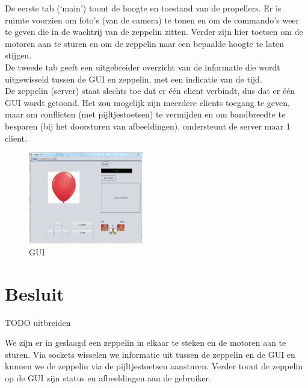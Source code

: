 \documentclass[eind]{penoverslag}
\begin{document}
De eerste tab (`main') toont de hoogte en toestand van de propellers. Er is ruimte voorzien om foto's (van de camera) te tonen en om de commando's weer te geven die in de wachtrij van de zeppelin zitten. Verder zijn hier toetsen om de motoren aan te sturen en om de zeppelin naar een bepaalde hoogte te laten stijgen.\\

De tweede tab geeft een uitgebreider overzicht van de informatie die wordt uitgewisseld tussen de GUI en zeppelin, met een indicatie van de tijd. \\

De zeppelin (server) staat slechts toe dat er \'e\'en client verbindt, dus dat er \'e\'en GUI wordt getoond. Het zou mogelijk zijn meerdere clients toegang te geven, maar om conflicten (met pijltjestoetsen) te vermijden en om bandbreedte te besparen (bij het doorsturen van afbeeldingen), ondersteunt de server maar 1 client. \\

\begin{figure}[ht!]
\centering
\includegraphics[height=40mm]{GUI.png}
\caption{GUI}
\label{GUI}
\end{figure}


\section{Besluit}
TODO uitbreiden

We zijn er in geslaagd een zeppelin in elkaar te steken en de motoren aan te sturen. Via sockets wisselen we informatie uit tussen de zeppelin en de GUI en kunnen we de zeppelin via de pijltjestoetsen aansturen. Verder toont de zeppelin op de GUI zijn status en afbeeldingen aan de gebruiker. \\




\newpage\makeappendix
\end{document}
